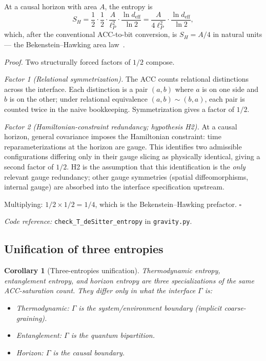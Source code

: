 \documentclass[11pt]{article}
\newtheorem{corollary}[theorem]{Corollary}
\theoremstyle{remark}
\newcommand{\coderef}[2]{\smallskip\noindent\textit{Code reference:} \texttt{#1} in \texttt{#2}.}
\begin{document}
\begin{tcolorbox}[apfbox, title={Theorem 6.1 (Horizon entropy prefactor)}]
At a causal horizon with area $A$, the entropy is
\[
S_H = \frac{1}{2} \cdot \frac{1}{2} \cdot \frac{A}{\ell_P^2} \cdot \frac{\ln d_{\mathrm{eff}}}{\ln 2}
= \frac{A}{4 \ell_P^2} \cdot \frac{\ln d_{\mathrm{eff}}}{\ln 2},
\]
which, after the conventional ACC-to-bit conversion, is $S_H = A/4$ in
natural units --- the Bekenstein--Hawking area law~\cite{Bekenstein1973,Hawking1975}.
\end{tcolorbox}

\textit{Proof.}  Two structurally forced factors of $1/2$ compose.

\textit{Factor 1 (Relational symmetrization).}  The ACC counts relational
distinctions across the interface.  Each distinction is a pair $(a, b)$
where $a$ is on one side and $b$ is on the other; under relational
equivalence $(a,b) \sim (b,a)$, each pair is counted twice in the naive
bookkeeping.  Symmetrization gives a factor of $1/2$.

\textit{Factor 2 (Hamiltonian-constraint redundancy; hypothesis H2).}
At a causal horizon, general covariance imposes the Hamiltonian
constraint: time reparameterizations at the horizon are gauge.  This
identifies two admissible configurations differing only in their gauge
slicing as physically identical, giving a second factor of $1/2$.  H2 is
the assumption that this identification is the \emph{only} relevant
gauge redundancy; other gauge symmetries (spatial diffeomorphisms,
internal gauge) are absorbed into the interface specification upstream.

Multiplying: $1/2 \times 1/2 = 1/4$, which is the Bekenstein--Hawking
prefactor.  \hfill$\square$

\coderef{check\_T\_deSitter\_entropy}{gravity.py}

\subsection{Unification of three entropies}

\begin{corollary}[Three-entropies unification]
Thermodynamic entropy, entanglement entropy, and horizon entropy are three
specializations of the same ACC-saturation count.  They differ only in
what the interface $\Gamma$ is:
\begin{itemize}
  \item Thermodynamic: $\Gamma$ is the system/environment boundary (implicit coarse-graining).
  \item Entanglement: $\Gamma$ is the quantum bipartition.
  \item Horizon: $\Gamma$ is the causal boundary.
\end{itemize}
\end{corollary}
\end{document}
